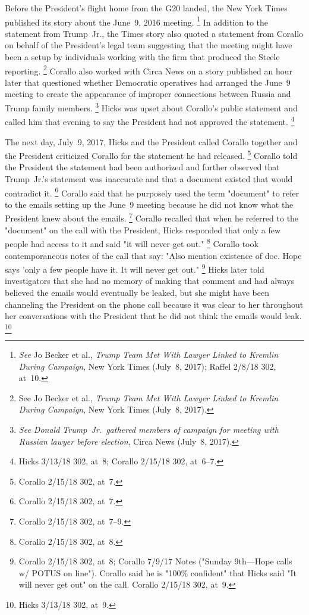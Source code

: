 Before the President's flight home from the G20 landed, the New York Times published its story about the June~9, 2016 meeting.%
\footnote{\textit{See} Jo Becker et al., \textit{Trump Team Met With Lawyer Linked to Kremlin During Campaign}, New York Times (July~8, 2017);
Raffel 2/8/18 302, at~10.}
In addition to the statement from Trump~Jr., the Times story also quoted a statement from Corallo on behalf of the President's legal team suggesting that the meeting might have been a setup by individuals working with the firm that produced the Steele reporting.%
\footnote{See Jo Becker et al., \textit{Trump Team Met With Lawyer Linked to Kremlin During Campaign}, New York Times (July~8, 2017).}
Corallo also worked with Circa News on a story published an hour later that questioned whether Democratic operatives had arranged the June~9 meeting to create the appearance of improper connections between Russia and Trump family members.%
\footnote{\textit{See Donald Trump~Jr.\ gathered members of campaign for meeting with Russian lawyer before election}, Circa News (July~8, 2017).}
Hicks was upset about Corallo's public statement and called him that evening to say the President had not approved the statement.%
\footnote{Hicks 3/13/18 302, at~8;
Corallo 2/15/18 302, at~6--7.}

The next day, July~9, 2017, Hicks and the President called Corallo together and the President criticized Corallo for the statement he had released.%
\footnote{Corallo 2/15/18 302, at~7.}
Corallo told the President the statement had been authorized and further observed that Trump~Jr.'s statement was inaccurate and that a document existed that would contradict it.%
\footnote{Corallo 2/15/18 302, at~7.}
Corallo said that he purposely used the term "document" to refer to the emails setting up the June~9 meeting because he did not know what the President knew about the emails.%
\footnote{Corallo 2/15/18 302, at~7--9.}
Corallo recalled that when he referred to the "document" on the call with the President, Hicks responded that only a few people had access to it and said "it will never get out."%
\footnote{Corallo 2/15/18 302, at~8.}
Corallo took contemporaneous notes of the call that say:
"Also mention existence of doc.
Hope says 'only a few people have it.
It will never get out."%
\footnote{Corallo 2/15/18 302, at~8;
Corallo 7/9/17 Notes ("Sunday 9th---Hope calls w/ POTUS on line").
Corallo said he is "100\% confident" that Hicks said "It will never get out" on the call.
Corallo 2/15/18 302, at~9.}
Hicks later told investigators that she had no memory of making that comment and had always believed the emails would eventually be leaked, but she might have been channeling the President on the phone call because it was clear to her throughout her conversations with the President that he did not think the emails would leak.%
\footnote{Hicks 3/13/18 302, at~9.}

